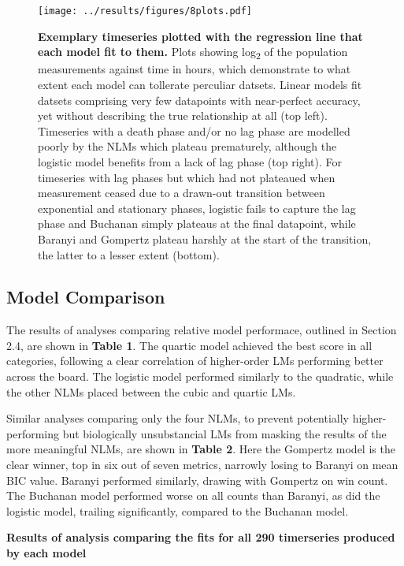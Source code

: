 \documentclass[11pt]{article}
\begin{document}
\begin{figure}[htb!]
    \centering
    \texttt{[image: ../results/figures/8plots.pdf]} 
    \caption{\textbf{Exemplary timeseries plotted with the regression line that each model fit to them.}  Plots showing log\textsubscript{2} of the population measurements against time in hours, which demonstrate to what extent each model can tollerate perculiar datsets. Linear models fit datsets comprising very few datapoints with near-perfect accuracy, yet without describing the true relationship at all (top left). Timeseries with a death phase and/or no lag phase are modelled poorly by the NLMs which plateau prematurely, although the logistic model benefits from a lack of lag phase (top right). For timeseries with lag phases but which had not plateaued when measurement ceased due to a drawn-out transition between exponential and stationary phases, logistic fails to capture the lag phase and Buchanan simply plateaus at the final datapoint, while Baranyi and Gompertz plateau harshly at the start of the transition, the latter to a lesser extent (bottom).}
\end{figure}


\subsection{Model Comparison}

The results of analyses comparing relative model performace, outlined in Section 2.4, are shown in \textbf{Table 1}. The quartic model achieved the best score in all categories, following a clear correlation of higher-order LMs performing better across the board. The logistic model performed similarly to the quadratic, while the other NLMs placed between the cubic and quartic LMs. 

Similar analyses comparing only the four NLMs, to prevent potentially higher-performing but biologically unsubstancial LMs from masking the results of the more meaningful NLMs, are shown in \textbf{Table 2}. Here the Gompertz model is the clear winner, top in six out of seven metrics, narrowly losing to Baranyi on mean BIC value. Baranyi performed similarly, drawing with Gompertz on win count. The Buchanan model performed worse on all counts than Baranyi, as did the logistic model, trailing significantly, compared to the Buchanan model. 

\begin{table}[htb]
    \centering
    \caption{\textbf{Results of analysis comparing the fits for all 290 timerseries produced by each model}}
\end{table}
\end{document}
